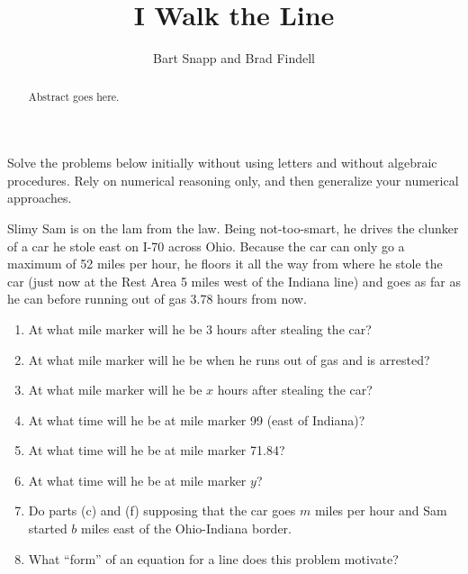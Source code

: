 \documentclass{ximera}
\title{I Walk the Line}
\author{Bart Snapp and Brad Findell}
\begin{document}
\begin{abstract}
Abstract goes here.  
\end{abstract}
\maketitle

\label{A:walk}
Solve the problems below initially without using letters and without algebraic procedures.  Rely on numerical reasoning only, and then generalize your numerical approaches.  

\begin{problem}
Slimy Sam is on the lam from the law.  Being not-too-smart, he drives
the clunker of a car he stole east on I-70 across Ohio.  Because the
car can only go a maximum of 52 miles per hour, he floors it all the
way from where he stole the car (just now at the Rest Area 5 miles
west of the Indiana line) and goes as far as he can before running out
of gas 3.78 hours from now.

\begin{enumerate}
\item At what mile marker will he be 3 hours after stealing the car?
\item At what mile marker will he be when he runs out of gas and is
  arrested?
\item At what mile marker will he be $x$ hours after
  stealing the car?
\item At what time will he be at mile marker 99 (east of Indiana)?
\item At what time will he be at mile marker 71.84?
\item At what time will he be at mile marker $y$?
\item Do parts (c) and (f) supposing that the car
  goes $m$ miles per hour and Sam started $b$ miles east of the
  Ohio-Indiana border.
\item What ``form'' of an equation for a line does this problem
  motivate?
\end{enumerate}
\end{problem}
\end{document}
